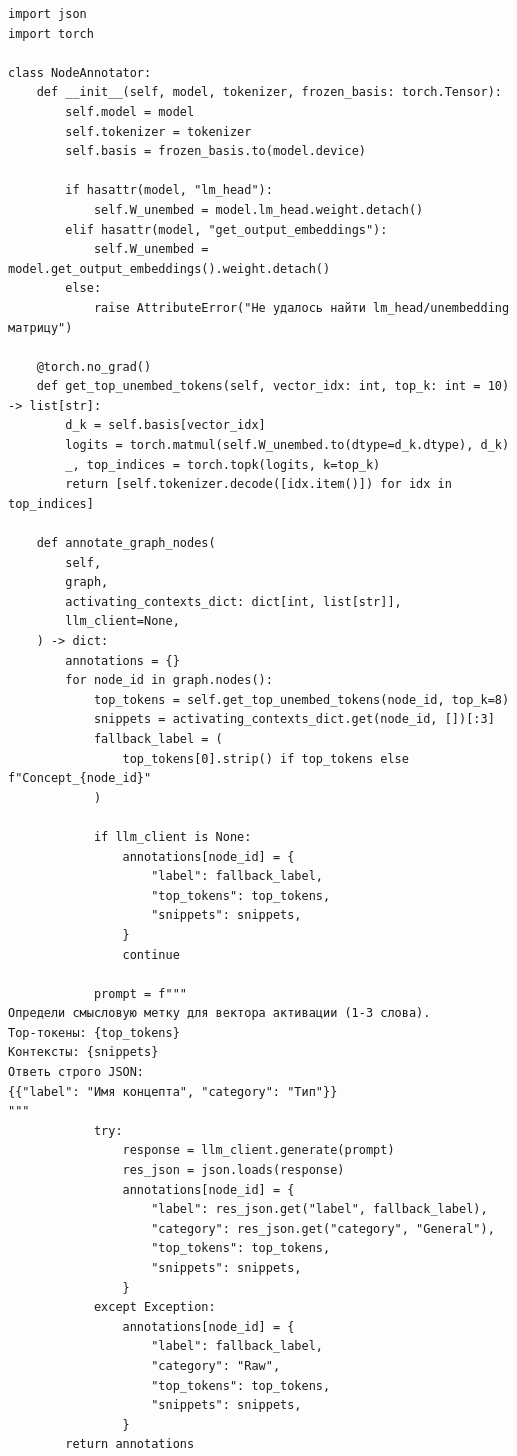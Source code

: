 \documentclass[11pt,a4paper]{article}
\begin{document}
\begin{lstlisting}
import json
import torch

class NodeAnnotator:
    def __init__(self, model, tokenizer, frozen_basis: torch.Tensor):
        self.model = model
        self.tokenizer = tokenizer
        self.basis = frozen_basis.to(model.device)

        if hasattr(model, "lm_head"):
            self.W_unembed = model.lm_head.weight.detach()
        elif hasattr(model, "get_output_embeddings"):
            self.W_unembed = model.get_output_embeddings().weight.detach()
        else:
            raise AttributeError("Не удалось найти lm_head/unembedding матрицу")

    @torch.no_grad()
    def get_top_unembed_tokens(self, vector_idx: int, top_k: int = 10) -> list[str]:
        d_k = self.basis[vector_idx]
        logits = torch.matmul(self.W_unembed.to(dtype=d_k.dtype), d_k)
        _, top_indices = torch.topk(logits, k=top_k)
        return [self.tokenizer.decode([idx.item()]) for idx in top_indices]

    def annotate_graph_nodes(
        self,
        graph,
        activating_contexts_dict: dict[int, list[str]],
        llm_client=None,
    ) -> dict:
        annotations = {}
        for node_id in graph.nodes():
            top_tokens = self.get_top_unembed_tokens(node_id, top_k=8)
            snippets = activating_contexts_dict.get(node_id, [])[:3]
            fallback_label = (
                top_tokens[0].strip() if top_tokens else f"Concept_{node_id}"
            )

            if llm_client is None:
                annotations[node_id] = {
                    "label": fallback_label,
                    "top_tokens": top_tokens,
                    "snippets": snippets,
                }
                continue

            prompt = f"""
Определи смысловую метку для вектора активации (1-3 слова).
Top-токены: {top_tokens}
Контексты: {snippets}
Ответь строго JSON:
{{"label": "Имя концепта", "category": "Тип"}}
"""
            try:
                response = llm_client.generate(prompt)
                res_json = json.loads(response)
                annotations[node_id] = {
                    "label": res_json.get("label", fallback_label),
                    "category": res_json.get("category", "General"),
                    "top_tokens": top_tokens,
                    "snippets": snippets,
                }
            except Exception:
                annotations[node_id] = {
                    "label": fallback_label,
                    "category": "Raw",
                    "top_tokens": top_tokens,
                    "snippets": snippets,
                }
        return annotations
\end{lstlisting}
\end{document}
